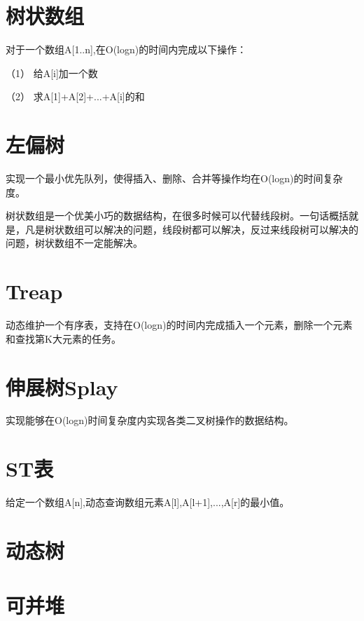 \section{树状数组} %
对于一个数组A[1..n],在O(logn)的时间内完成以下操作：

（1） 给A[i]加一个数

（2） 求A[1]+A[2]+...+A[i]的和

\section{左偏树}
实现一个最小优先队列，使得插入、删除、合并等操作均在O(logn)的时间复杂度。

树状数组是一个优美小巧的数据结构，在很多时候可以代替线段树。一句话概括就是，凡是树状数组可以解决的问题，线段树都可以解决，反过来线段树可以解决的问题，树状数组不一定能解决。

\section{Treap}
动态维护一个有序表，支持在O(logn)的时间内完成插入一个元素，删除一个元素和查找第K大元素的任务。

\section{伸展树Splay}
实现能够在O(logn)时间复杂度内实现各类二叉树操作的数据结构。

\section{ST表}
给定一个数组A[n],动态查询数组元素A[l],A[l+1],...,A[r]的最小值。
\section{动态树}

\section{可并堆}
